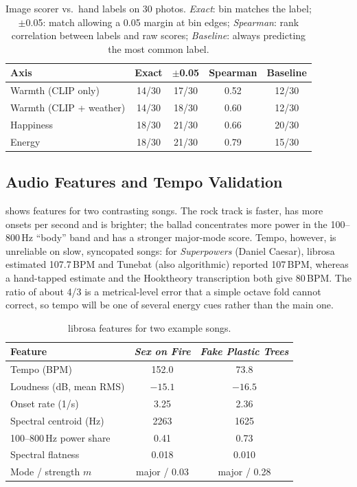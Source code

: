 \documentclass{article}
\begin{document}
\begin{table}[!htb]
  \centering\footnotesize
  \setlength{\tabcolsep}{3pt}
  \begin{tabular}{@{}lcccc@{}}
  \toprule
  Axis & Exact & $\pm$0.05 & Spearman & Baseline \\
  \midrule
  Warmth (CLIP only)       & 14/30 & 17/30 & 0.52 & 12/30 \\
  Warmth (CLIP + weather)  & 14/30 & 18/30 & 0.60 & 12/30 \\
  Happiness                & 18/30 & 21/30 & 0.66 & 20/30 \\
  Energy                   & 18/30 & 21/30 & 0.79 & 15/30 \\
  \bottomrule
  \end{tabular}
  \caption{Image scorer vs.\ hand labels on 30 photos. \emph{Exact}: bin matches
  the label; $\pm$0.05: match allowing a 0.05 margin at bin edges; 
  \emph{Spearman}: rank correlation between labels and raw scores; 
  \emph{Baseline}: always predicting the
  most common label.}
  \label{tab:d5}
\end{table}


\subsection{Audio Features and Tempo Validation}

 shows features for two contrasting songs. The rock track is
faster, has more onsets per second and is brighter; the ballad concentrates
more power in the 100--800\,Hz ``body'' band and has a stronger major-mode
score. Tempo, however, is unreliable on slow, syncopated songs: for
\emph{Superpowers} (Daniel Caesar), librosa estimated 107.7\,BPM and
Tunebat (also algorithmic) reported 107\,BPM, whereas a hand-tapped estimate
and the Hooktheory transcription both give 80\,BPM. The ratio of about 4/3
is a metrical-level error that a simple octave fold cannot correct, so tempo
will be one of several energy cues rather than the main one.

\begin{table}[t]
\centering\footnotesize
\begin{tabular}{@{}lcc@{}}
\toprule
Feature & \emph{Sex on Fire} & \emph{Fake Plastic Trees} \\
\midrule
Tempo (BPM)            & 152.0 & 73.8 \\
Loudness (dB, mean RMS) & $-15.1$ & $-16.5$ \\
Onset rate (1/s)       & 3.25 & 2.36 \\
Spectral centroid (Hz) & 2263 & 1625 \\
100--800\,Hz power share & 0.41 & 0.73 \\
Spectral flatness      & 0.018 & 0.010 \\
Mode / strength $m$    & major / 0.03 & major / 0.28 \\
\bottomrule
\end{tabular}
\caption{librosa features for two example songs.}
\label{tab:audio}
\end{table}
\end{document}
